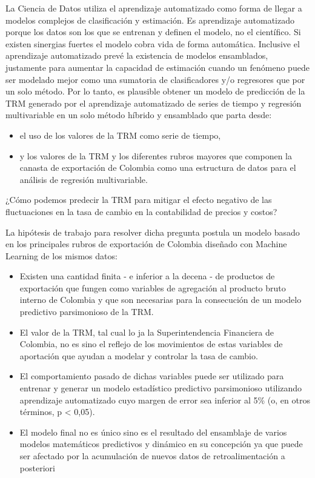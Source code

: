 La Ciencia de Datos utiliza el aprendizaje automatizado como forma de llegar a modelos complejos de clasificación y estimación. Es aprendizaje automatizado porque los datos son los que se entrenan y definen el modelo, no el científico. Si existen sinergias fuertes el modelo cobra vida de forma automática. Inclusive el aprendizaje automatizado prevé la existencia de modelos ensamblados, justamente para aumentar la capacidad de estimación cuando un fenómeno puede ser modelado mejor como una sumatoria de clasificadores y/o regresores que por un solo método. Por lo tanto, es plausible obtener un modelo de predicción de la TRM generado por el aprendizaje automatizado de series de tiempo y regresión multivariable en un solo método híbrido y ensamblado que parta desde:
 
\begin{itemize}
\item el uso de los valores de la TRM como serie de tiempo,
\item y los valores de la TRM y los diferentes rubros mayores que componen la canasta de exportación de Colombia como una estructura de datos para el análisis de regresión multivariable.
\end{itemize}

¿Cómo podemos predecir la TRM para mitigar el efecto negativo de las fluctuaciones en la tasa de cambio en la contabilidad de precios y costos?

La hipótesis de trabajo para resolver dicha pregunta postula un modelo basado en los principales rubros de exportación de Colombia diseñado con Machine Learning de los mismos datos:
\begin{itemize}
\item Existen una cantidad finita - e inferior a la decena - de productos de exportación que fungen como variables de agregación al producto bruto interno de Colombia y que son necesarias para la consecución de un modelo predictivo parsimonioso de la TRM.
\item El valor de la TRM, tal cual lo ja la Superintendencia Financiera de Colombia, no es sino el reflejo de los movimientos de estas variables de aportación que ayudan a modelar y controlar la tasa de cambio.
\item El comportamiento pasado de dichas variables puede ser utilizado para entrenar y generar un modelo estadístico predictivo parsimonioso utilizando aprendizaje automatizado cuyo margen de error sea inferior al 5\% (o, en otros términos, p < 0,05).
\item El modelo final no es único sino es el resultado del ensamblaje de varios modelos matemáticos predictivos y dinámico en su concepción ya que puede ser afectado por la acumulación de nuevos datos de retroalimentación a posteriori 
\end{itemize}


